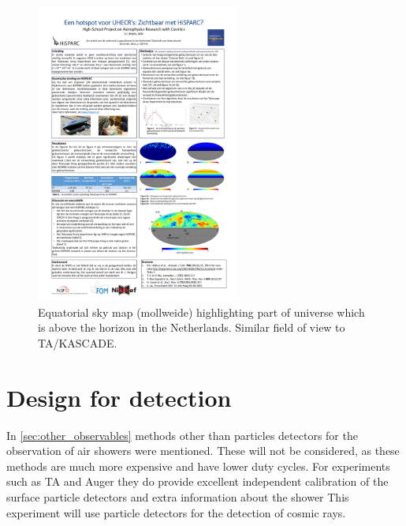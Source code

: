 \begin{figure}
    \centering
    \includegraphics[width=0.6\textwidth]
                    {plots/experiment/visible_sky_map}
    \caption{Equatorial sky map (mollweide) highlighting part of universe which is above the horizon in the Netherlands. Similar field of view to TA/KASCADE.}
    \label{fig:visible_sky_map}
\end{figure}


\section{Design for detection}

In \cref{sec:other_observables} methods other than particles detectors for the observation of air showers were mentioned. These will not be considered, as these methods are much more expensive and have lower duty cycles. For experiments such as TA and Auger they do provide excellent independent calibration of the surface particle detectors and extra information about the shower This experiment will use particle detectors for the detection of cosmic rays.

